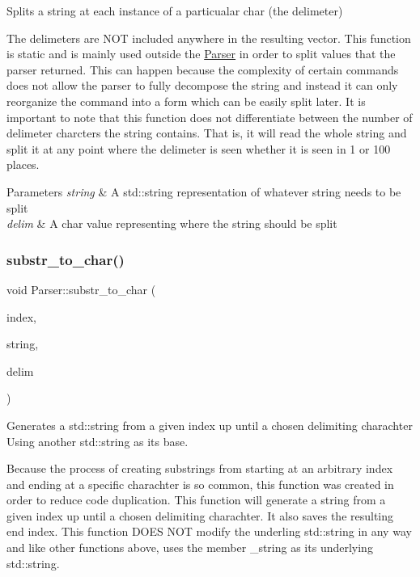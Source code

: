 Splits a string at each instance of a particualar char (the delimeter) 

The delimeters are N\+OT included anywhere in the resulting vector. This function is static and is mainly used outside the \mbox{\hyperlink{class_parser}{Parser}} in order to split values that the parser returned. This can happen because the complexity of certain commands does not allow the parser to fully decompose the string and instead it can only reorganize the command into a form which can be easily split later. It is important to note that this function does not differentiate between the number of delimeter charcters the string contains. That is, it will read the whole string and split it at any point where the delimeter is seen whether it is seen in 1 or 100 places.


\begin{DoxyParams}{Parameters}
{\em string} & A std\+::string representation of whatever string needs to be split \\
\hline
{\em delim} & A char value representing where the string should be split \\
\hline
\end{DoxyParams}
\mbox{\label{class_parser_a69c2ea3723b454b2627ecaf0fe7c88ea}} 
\subsubsection{\texorpdfstring{substr\+\_\+to\+\_\+char()}{substr\_to\_char()}}
{\footnotesize\ttfamily void Parser\+::substr\+\_\+to\+\_\+char (\begin{DoxyParamCaption}\item[{int \&}]{index,  }\item[{std\+::string \&}]{string,  }\item[{char}]{delim }\end{DoxyParamCaption})\hspace{0.3cm}{\ttfamily [private]}}



Generates a std\+::string from a given index up until a chosen delimiting charachter Using another std\+::string as its base. 

Because the process of creating substrings from starting at an arbitrary index and ending at a specific charachter is so common, this function was created in order to reduce code duplication. This function will generate a string from a given index up until a chosen delimiting charachter. It also saves the resulting end index. This function D\+O\+ES N\+OT modify the underling std\+::string in any way and like other functions above, uses the member \+\_\+string as its underlying std\+::string.


